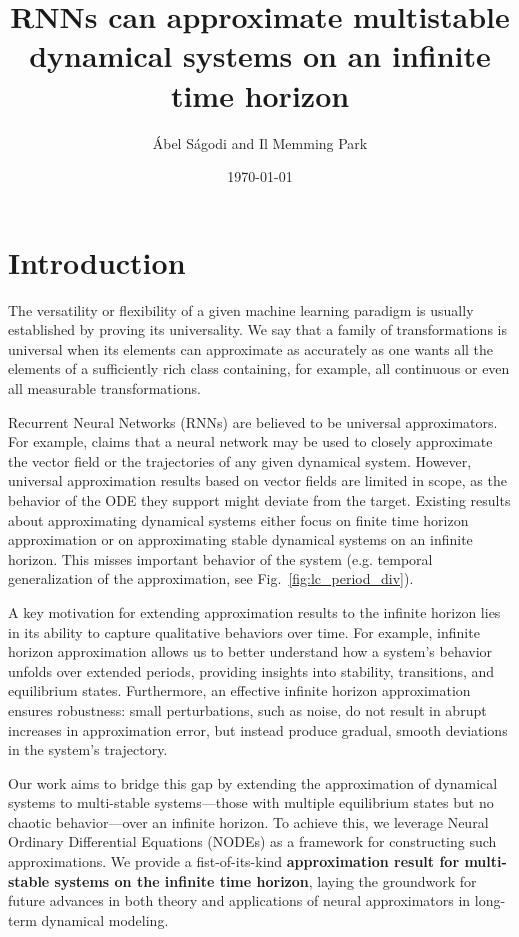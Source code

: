 \documentclass{article}
\title{RNNs can approximate multistable dynamical systems on an infinite time horizon}
\author{\'Abel S\'agodi and Il Memming Park}
\date{\today}
\theoremstyle{definition}
\theoremstyle{remark}
\newcounter{ct}
\begin{document}
\maketitle

\section{Introduction}
The versatility or flexibility of a given machine learning paradigm is usually established by proving its universality.
We say that a family of transformations is universal when its elements can approximate as accurately as one wants all the elements of a sufficiently rich class containing, for example, all continuous or even all measurable transformations.

Recurrent Neural Networks (RNNs) are believed to be universal approximators.
For example, \citet{durstewitz2023reconstructing} claims that 
 a neural network may be used to closely approximate the vector field or the trajectories of any given dynamical system.
However, universal approximation results based on vector fields are limited in scope, as the behavior of the ODE they support might deviate from the target.
Existing results about approximating dynamical systems either focus on finite time horizon approximation or on approximating stable dynamical systems on an infinite horizon.
This misses important behavior of the system (e.g. temporal generalization of the approximation, see Fig.~\ref{fig:lc_period_div}).

A key motivation for extending approximation results to the infinite horizon lies in its ability to capture qualitative behaviors over time. For example, infinite horizon approximation allows us to better understand how a system's behavior unfolds over extended periods, providing insights into stability, transitions, and equilibrium states.
 Furthermore, an effective infinite horizon approximation ensures robustness: small perturbations, such as noise, do not result in abrupt increases in approximation error, but instead produce gradual, smooth deviations in the system's trajectory.

Our work aims to bridge this gap by extending the approximation of dynamical systems to multi-stable systems—those with multiple equilibrium states but no chaotic behavior—over an infinite horizon. 
To achieve this, we leverage Neural Ordinary Differential Equations (NODEs) as a framework for constructing such approximations.
We provide a fist-of-its-kind \textbf{approximation result for multi-stable systems on the infinite time horizon}, laying the groundwork for future advances in both theory and applications of neural approximators in long-term dynamical modeling.
\end{document}
